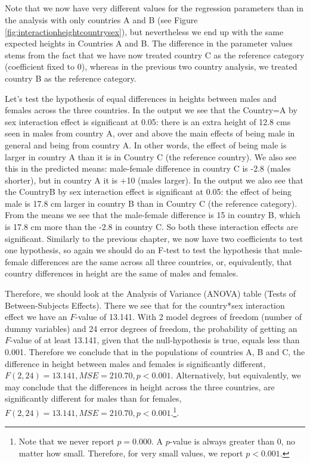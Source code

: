 \documentclass[]{report}\usepackage[]{graphicx}\usepackage[]{color}
\begin{document}
\\
\\
\\
\\
Note that we now have very different values for the regression parameters than in the analysis with only countries A and B (see Figure \ref{fig:interactionheightcountrysex}), but nevertheless we end up with the same expected heights in Countries A and B. The difference in the parameter values stems from the fact that we have now treated country C as the reference category (coefficient fixed to 0), whereas in the previous two country analysis, we treated country B as the reference category. 

Let's test the hypothesis of equal differences in heights between males and females across the three countries. In the output we see that the Country=A by sex interaction effect is significant at 0.05: there is an extra height of 12.8 cms seen in males from country A, over and above the main effects of being male in general and being from country A. In other words, the effect of being male is larger in country A than it is in Country C (the reference country). We also see this in the predicted means: male-female difference in country C is -2.8 (males shorter), but in country A it is +10 (males larger). In the output we also see that the CountryB by sex interaction effect is significant at 0.05: the effect of being male is 17.8 cm larger in country B than in Country C (the reference category). From the means we see that the male-female difference is 15 in country B, which is 17.8 cm more than the -2.8 in country C. So both these interaction effects are significant. Similarly to the previous chapter, we now have two coefficients to test one hypothesis, so again we should do an F-test to test the hypothesis that male-female differences are the same across all three countries, or, equivalently, that country differences in height are the same of males and females.



Therefore, we should look at the Analysis of Variance (ANOVA) table (Tests of Between-Subjects Effects). There we see that for the country*sex interaction effect we have an $F$-value of 13.141. With 2 model degrees of freedom (number of dummy variables) and 24 error degrees of freedom, the probability of getting an $F$-value of at least 13.141, given that the null-hypothesis is true, equals less than 0.001. Therefore we conclude that in the populations of countries A, B and C, the difference in height between males and females is significantly different, $F(2,24)=13.141, MSE=210.70, p < 0.001$. Alternatively, but equivalently, we may conclude that the differences in height across the three countries, are significantly different for males than for females, $F(2,24)=13.141, MSE=210.70, p < 0.001$.\footnote{Note that we never report $p=0.000$. A $p$-value is always greater than 0, no matter how small. Therefore, for very small values, we report $p < 0.001$.}. 
\end{document}
